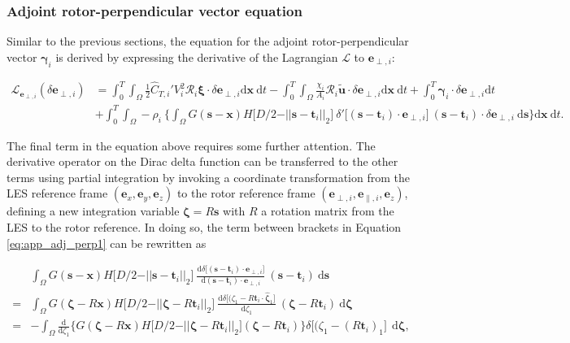 \documentclass[energies,article,submit,moreauthors,latex,10pt,a4paper]{mdpi}
\newcommand{\ds}{~\text{d}\boldsymbol{s}}
\newcommand{\dzeta}{~\text{d}\boldsymbol{\zeta}}
\newcommand{\bs}[1]{\boldsymbol{#1}}
\newcommand{\dx}{\text{d}\boldsymbol{x}}
\newcommand{\dt}{\text{d}t}
\newcommand{\stint}{\int_{0}^{T} \int_{\Omega}}
\newcommand{\sint}{\int_{\Omega}}
\newcommand{\Tint}{\int_{0}^{T}}
\newcommand{\utilde}{\widetilde{\bs{u}}}
\newcommand{\ctihat}{\widehat{C}_{T,i}'}
\newcommand{\R}{\mathscr{R}}
\newcommand{\Lagr}{\mathscr{L}}
\newcommand{\eperpi}{\bs{e}_{\perp,i}}
\newcommand{\etransi}{\bs{e}_{\parallel,i}}
\newcommand{\diracdelta}{{\delta}}
\begin{document}
\subsubsection{Adjoint rotor-perpendicular vector equation}
\noindent Similar to the previous sections, the equation for the adjoint rotor-perpendicular vector $\bs{\gamma}_i$ is derived by expressing the derivative of the Lagrangian $\Lagr$ to $\eperpi$:

\begin{align}
\Lagr_{\eperpi}(\delta \eperpi) &= \stint \frac{1}{2} \ctihat V_i^2 \R_i \bs{\xi} \cdot \delta \eperpi \dx ~ \dt - \stint \frac{\chi_i}{A_i} \R_i \utilde \cdot \delta \eperpi \dx~ \dt + \Tint \bs{\gamma}_i \cdot \delta \eperpi \dt \nonumber \\
& + \stint - \rho_i ~ \bigg\{ \sint G(\bs{s} - \bs{x})  H\big[D/2 - \vert\vert \bs{s} - \bs{t}_i \vert\vert_2 \big]~\diracdelta'\big[(\bs{s} - \bs{t}_i) \cdot \eperpi \big]~(\bs{s} - \bs{t}_i) \cdot \delta \eperpi \ds \bigg\} \dx ~\dt \label{eq:app_adj_perp1}.
\end{align}

\noindent The final term in the equation above requires some further attention. The derivative operator on the Dirac delta function can be transferred to the other terms using partial integration by invoking a coordinate transformation from  the LES reference frame $(\bs{e}_x, \bs{e}_y, \bs{e}_z)$ to the rotor reference frame $(\eperpi, \etransi, \bs{e}_z)$, defining a new integration variable $\bs{\zeta} = R\bs{s}$ with $R$ a rotation matrix from the LES to the rotor reference. In doing so, the term between brackets in Equation \eqref{eq:app_adj_perp1} can be rewritten as 

\begin{align}
&\sint G(\bs{s} - \bs{x})  H\big[D/2 - \vert\vert \bs{s} - \bs{t}_i \vert\vert_2 \big]~\frac{\text{d}\diracdelta\big[(\bs{s} - \bs{t}_i) \cdot \eperpi \big]}{\text{d} (\bs{s} - \bs{t}_i) \cdot \eperpi}~(\bs{s} - \bs{t}_i)  \nonumber \ds\\
= &\sint G(\bs{\zeta} - R\bs{x})  H\big[D/2 - \vert\vert \bs{\zeta} - R\bs{t}_i \vert\vert_2 \big]~\frac{\text{d}\diracdelta\big[(\zeta_1 - R\bs{t}_i \cdot \hat{\bs{\zeta}}_1 \big]}{\text{d}\zeta_1}~(\bs{\zeta} - R\bs{t}_i) \dzeta \nonumber \\
= & - \sint \frac{\text{d}}{\text{d}\zeta_1} \bigg\{ G(\bs{\zeta} - R\bs{x})  H\big[D/2 - \vert\vert \bs{\zeta} - R\bs{t}_i \vert\vert_2 \big] (\bs{\zeta} - R\bs{t}_i)  \bigg\} \diracdelta\big[(\zeta_1 - (R\bs{t}_i)_1 \big]~ \dzeta,
\end{align}
\end{document}
